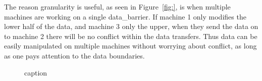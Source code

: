 \documentclass[report.tex]{subfiles}
\begin{document}
    The reason granularity is useful, as seen in Figure~\ref{fig:}, is when multiple machines are working on a single data\_barrier. If machine 1 only modifies the lower half of the data, and machine 3 only the upper, when they send the data on to machine 2 there will be no conflict within the data transfers. Thus data can be easily manipulated on multiple machines without worrying about conflict, as long as one pays attention to the data boundaries.

    \begin{figure}[htbp]
      \centering



      \caption{caption}
      \label{fig:label}
    \end{figure}


\label{sub:data_barrier_class}

\end{document}
